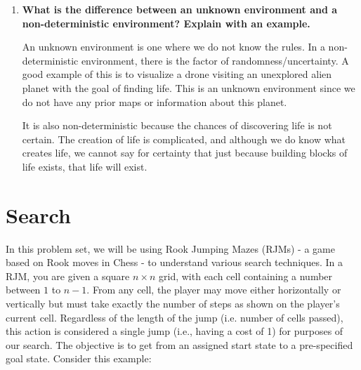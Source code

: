 \documentclass[a4paper]{article}
\begin{document}
\begin{sloppypar}
\begin{enumerate}[start=1,label=Q\arabic*,left=0pt]
    \item \textbf{What is the difference between an unknown environment and a non-deterministic environment? Explain with an example.}
    \par An unknown environment is one where we do not know the rules. In a non-deterministic environment, there is the factor of randomness/uncertainty. A good example
    of this is to visualize a drone visiting an unexplored alien planet with the goal of finding life. This is an unknown environment since we do not have any prior maps or information 
    about this planet. 
    
    It is also non-deterministic because the chances of discovering life is not certain. The creation of life is complicated,
    and although we do know what creates life, we cannot say for certainty that just because building blocks of life exists, that life will exist.

\end{enumerate}

\section{Search}

In this problem set, we will be using Rook Jumping Mazes (RJMs) - a game based on
Rook moves in Chess - to understand various search techniques. In a RJM, you are
given a square $n \times n$ grid, with each cell containing a number between $1$ to $n - 1$. From
any cell, the player may move either horizontally or vertically but must take exactly the
number of steps as shown on the player’s current cell. Regardless of the length of the
jump (i.e. number of cells passed), this action is considered a single jump (i.e., having a
cost of 1) for purposes of our search. The objective is to get from an assigned start state
to a pre-specified goal state. Consider this example:


\end{sloppypar}
\end{document}

